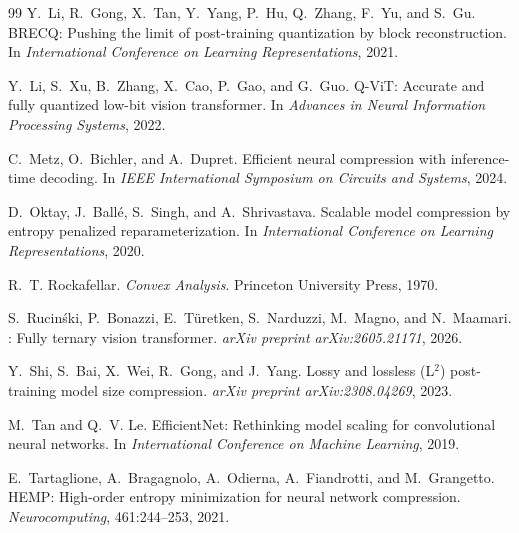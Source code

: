 \documentclass{article}
\begin{document}
{\begin{thebibliography}{99}
Y.~Li, R.~Gong, X.~Tan, Y.~Yang, P.~Hu, Q.~Zhang, F.~Yu, and S.~Gu.
\newblock BRECQ: Pushing the limit of post-training quantization by block
reconstruction.
\newblock In \emph{International Conference on Learning Representations}, 2021.

Y.~Li, S.~Xu, B.~Zhang, X.~Cao, P.~Gao, and G.~Guo.
\newblock Q-ViT: Accurate and fully quantized low-bit vision transformer.
\newblock In \emph{Advances in Neural Information Processing Systems}, 2022.

C.~Metz, O.~Bichler, and A.~Dupret.
\newblock Efficient neural compression with inference-time decoding.
\newblock In \emph{IEEE International Symposium on Circuits and Systems}, 2024.

D.~Oktay, J.~Ball{\'e}, S.~Singh, and A.~Shrivastava.
\newblock Scalable model compression by entropy penalized reparameterization.
\newblock In \emph{International Conference on Learning Representations}, 2020.

R.~T. Rockafellar.
\newblock \emph{Convex Analysis}.
\newblock Princeton University Press, 1970.

S.~Rucin{\'s}ki, P.~Bonazzi, E.~T{\"u}retken, S.~Narduzzi, M.~Magno, and
  N.~Maamari.
: Fully ternary vision transformer.
\newblock \emph{arXiv preprint arXiv:2605.21171}, 2026.

Y.~Shi, S.~Bai, X.~Wei, R.~Gong, and J.~Yang.
\newblock Lossy and lossless (L$^2$) post-training model size compression.
\newblock \emph{arXiv preprint arXiv:2308.04269}, 2023.

M.~Tan and Q.~V. Le.
\newblock EfficientNet: Rethinking model scaling for convolutional neural
  networks.
\newblock In \emph{International Conference on Machine Learning}, 2019.

E.~Tartaglione, A.~Bragagnolo, A.~Odierna, A.~Fiandrotti, and M.~Grangetto.
\newblock HEMP: High-order entropy minimization for neural network compression.
\newblock \emph{Neurocomputing}, 461:244--253, 2021.


\end{thebibliography}}
\end{document}

